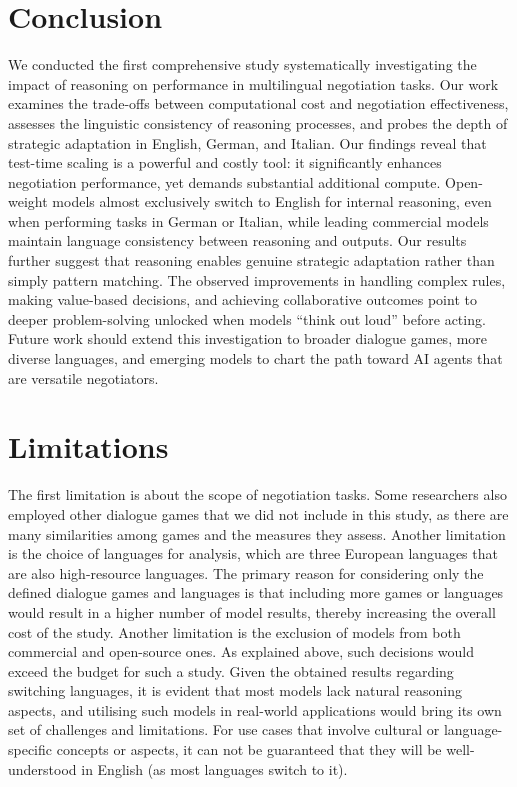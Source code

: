 \documentclass[11pt]{article}
\begin{document}
\section{Conclusion}

We conducted the first comprehensive study systematically investigating the impact of reasoning on performance in multilingual negotiation tasks. 
Our work examines the trade-offs between computational cost and negotiation effectiveness, assesses the linguistic consistency of reasoning processes, and probes the depth of strategic adaptation in English, German, and Italian. Our findings reveal that test-time scaling is a powerful and costly tool: it significantly enhances negotiation performance, yet demands substantial additional compute. 
Open-weight models almost exclusively switch to English for internal reasoning, even when performing tasks in German or Italian, while leading commercial models maintain language consistency between reasoning and outputs. Our results further suggest that reasoning enables genuine strategic adaptation rather than simply pattern matching. The observed improvements in handling complex rules, making value-based decisions, and achieving collaborative outcomes point to deeper problem-solving unlocked when models ``think out loud'' before acting. 
Future work should extend this investigation to broader dialogue games, more diverse languages, and emerging models to chart the path toward AI agents that are versatile negotiators.


\section*{Limitations}

The first limitation is about the scope of negotiation tasks. Some researchers also employed other dialogue games that we did not include in this study, as there are many similarities among games and the measures they assess. Another limitation is the choice of languages for analysis, which are three European languages that are also high-resource languages. The primary reason for considering only the defined dialogue games and languages is that including more games or languages would result in a higher number of model results, thereby increasing the overall cost of the study. Another limitation is the exclusion of models from both commercial and open-source ones. As explained above, such decisions would exceed the budget for such a study. Given the obtained results regarding switching languages, it is evident that most models lack natural reasoning aspects, and utilising such models in real-world applications would bring its own set of challenges and limitations. For use cases that involve cultural or language-specific concepts or aspects, it can not be guaranteed that they will be well-understood in English (as most languages switch to it).
\end{document}

